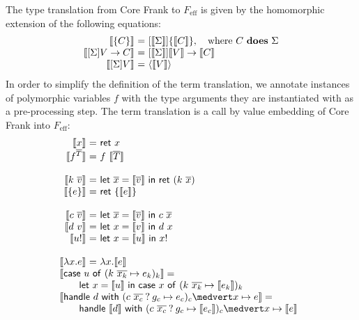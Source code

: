 \documentclass[preprint]{sigplanconf}
\makeatletter
\newcommand{\feff}{$F_\textrm{eff}$\xspace}
\newcommand{\set}[1]{\{#1\}}
\newcommand{\many}{\overline}
\newcommand{\sem}[1]{\llbracket{#1}\rrbracket}
\newcommand{\seml}{\left\llbracket}
\newcommand{\semr}{\right\rrbracket}
\newcommand{\dom}{\mathit{dom}}
\newcommand\ba{\begin{array}}
\newcommand\ea{\end{array}}
\newcommand{\bl}{\ba{@{}c@{}}}
\newcommand{\el}{\ea}
\newenvironment{equations}{\[\ba{@{}r@{~}c@{~}l@{}}}{\ea\]}
\newcommand{\judgeword}[1]{~\mathbf{#1}~}
\newcommand{\sigentails}[1]{\mathbin{[{\text{\scriptsize ${#1}$}}]\!\text{-\!-}}\,}
\newcommand{\rt}[1]{\langle{#1}\rangle}   %
\newcommand{\makes}[4]  {#1 \sigentails{#2} {#3} \judgeword{is} {#4}}
\newcommand{\effs}[2]{{#1} \judgeword{does} {#2}}
\newcommand{\makesgs}{\makes{\Gamma}{\sigs}}
\newcommand{\sigs}{\Sigma}
\newcommand{\effbox}[1]{[#1]}
\newcommand{\key}[1]{\mathsf{#1}}
\newcommand{\handleSymbol}{\mathbin{?}}
\newcommand{\handle}[2]{{#1} \handleSymbol {#2}}
\newcommand{\thunk}[1]{\{{#1}\}}
\newcommand{\force}[1]{{#1}!}
\makeatother
\begin{document}
The type translation from Core Frank to \feff is given by the
homomorphic extension of the following equations:
\begin{equations}
\sem{\thunk{C}} &=& \effbox{\sem{\sigs}}\thunk{\sem{C}}, \quad \text{where }\effs{C}{\sigs} \\
\sem{\effbox{\sigs}V \to C} &=& \effbox{\sem{\sigs}}\sem{V} \to \sem{C} \\
\sem{\effbox{\sigs}V} &=& \rt{\sem{V}}\\
\end{equations}%
%
%
In order to simplify the definition of the term translation, we
annotate instances of polymorphic variables $f$ with the type
arguments they are instantiated with as a pre-processing step.
%
The term translation is a call by value embedding of Core Frank into
\feff:
%
\begin{equations}
\sem{x} &=& \key{ret}~x \\
\sem{f^{\many{T}}} &=& f~\sem{\many{T}} \\
\\
\sem{k~\many{v}} &=& \key{let}~\many{x}=\sem{\many{v}} ~\key{in}~\key{ret}~(k~\many{x}) \\
\sem{\thunk{e}} &=& \key{ret}~\thunk{\sem{e}} \\
\\
\sem{c~\many{v}} &=& \key{let}~\many{x}=\sem{\many{v}} ~\key{in}~c~\many{x} \\
\sem{d~v} &=& \key{let}~x=\sem{v} ~\key{in}~d~x \\
\sem{\force{u}} &=& \key{let}~x=\sem{u} ~\key{in}~\force{x} \\
\\
\sem{\lambda x.e} &=& \lambda x.\sem{e} \\
\multicolumn{3}{@{}l}{\sem{\key{case}~u~\key{of}~(k~\many{x_k} \mapsto e_k)_k} =} \\
\multicolumn{3}{@{}l}
  {\qquad \key{let}~x=\sem{u} ~\key{in}~
    \key{case}~x~\key{of}~(k~\many{x_k} \mapsto \sem{e_k})_k} \\
\multicolumn{3}{@{}l}{\sem{\key{handle}~d~\key{with}~(\handle{c~\many{x_c}}{g_c} \mapsto e_c)_c \medvert x \mapsto e} =} \\
\multicolumn{3}{@{}l}
  {\qquad \key{handle}~\sem{d}~\key{with}~ 
            (\handle{c~\many{x_c}}{g_c} \mapsto \sem{e_c})_c
            \medvert x \mapsto \sem{e}} \\
\end{equations}%
%
\end{document}
